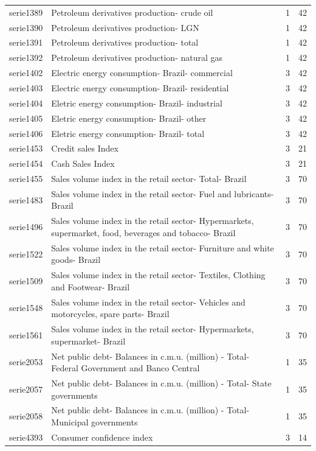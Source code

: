 \documentclass{article}
\begin{document}
\begin{landscape}
\begin{center}
\begin{longtable}{|l|l|l|l|}
serie1389 & Petroleum derivatives production- crude oil & 1 & 42 \\
serie1390 & Petroleum derivatives production- LGN & 1 & 42 \\
serie1391 & Petroleum derivatives production- total & 1 & 42 \\
serie1392 & Petroleum derivatives production- natural gas & 1 & 42 \\
serie1402 & Electric energy consumption- Brazil- commercial & 3 & 42 \\
serie1403 & Electric energy consumption- Brazil- residential & 3 & 42 \\
serie1404 & Eletric energy consumption- Brazil- industrial & 3 & 42 \\
serie1405 & Eletric energy consumption- Brazil- other & 3 & 42 \\
serie1406 & Eletric energy consumption- Brazil- total & 3 & 42 \\
serie1453 & Credit sales Index & 3 & 21 \\
serie1454 & Cash Sales Index & 3 & 21 \\
serie1455 & Sales volume index in the retail sector- Total- Brazil & 3 & 70 \\
serie1483 & Sales volume index in the retail sector- Fuel and lubricants- Brazil & 3 & 70 \\
serie1496 & Sales volume index in the retail sector- Hypermarkets, supermarket, food, beverages and tobacco- Brazil & 3 & 70 \\
serie1522 & Sales volume index in the retail sector- Furniture and white goods- Brazil & 3 & 70 \\
serie1509 & Sales volume index in the retail sector- Textiles, Clothing and Footwear- Brazil & 3 & 70 \\
serie1548 & Sales volume index in the retail sector- Vehicles and motorcycles, spare parts- Brazil & 3 & 70 \\
serie1561 & Sales volume index in the retail sector- Hypermarkets, supermarket- Brazil & 3 & 70 \\
serie2053 & Net public debt- Balances in c.m.u. (million) - Total- Federal Government and Banco Central & 1 & 35 \\
serie2057 & Net public debt- Balances in c.m.u. (million) - Total- State governments & 1 & 35 \\
serie2058 & Net public debt- Balances in c.m.u. (million) - Total- Municipal governments & 1 & 35 \\
serie4393 & Consumer confidence index & 3 & 14 \\

\end{longtable}
\end{center}
\end{landscape}
\end{document}
